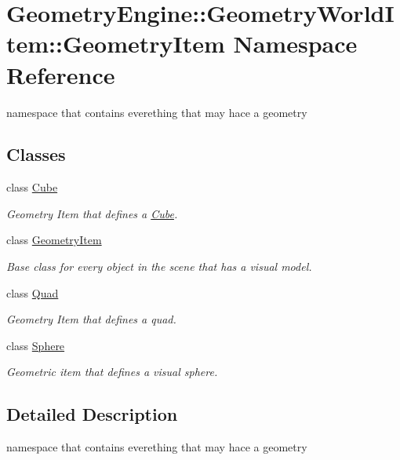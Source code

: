 \hypertarget{namespace_geometry_engine_1_1_geometry_world_item_1_1_geometry_item}{}\section{Geometry\+Engine\+::Geometry\+World\+Item\+::Geometry\+Item Namespace Reference}
\label{namespace_geometry_engine_1_1_geometry_world_item_1_1_geometry_item}


namespace that contains everething that may hace a geometry  


\subsection*{Classes}
\begin{DoxyCompactItemize}
\item 
class \mbox{\hyperlink{class_geometry_engine_1_1_geometry_world_item_1_1_geometry_item_1_1_cube}{Cube}}
\begin{DoxyCompactList}\small\item\em Geometry Item that defines a \mbox{\hyperlink{class_geometry_engine_1_1_geometry_world_item_1_1_geometry_item_1_1_cube}{Cube}}. \end{DoxyCompactList}\item 
class \mbox{\hyperlink{class_geometry_engine_1_1_geometry_world_item_1_1_geometry_item_1_1_geometry_item}{Geometry\+Item}}
\begin{DoxyCompactList}\small\item\em Base class for every object in the scene that has a visual model. \end{DoxyCompactList}\item 
class \mbox{\hyperlink{class_geometry_engine_1_1_geometry_world_item_1_1_geometry_item_1_1_quad}{Quad}}
\begin{DoxyCompactList}\small\item\em Geometry Item that defines a quad. \end{DoxyCompactList}\item 
class \mbox{\hyperlink{class_geometry_engine_1_1_geometry_world_item_1_1_geometry_item_1_1_sphere}{Sphere}}
\begin{DoxyCompactList}\small\item\em Geometric item that defines a visual sphere. \end{DoxyCompactList}\end{DoxyCompactItemize}


\subsection{Detailed Description}
namespace that contains everething that may hace a geometry 